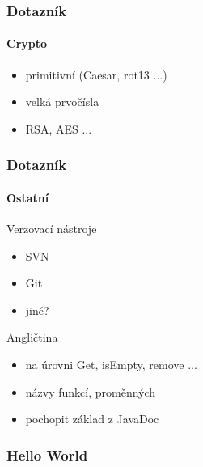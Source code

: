 \documentclass[nologo]{slides}
\begin{document}
\begin{frame}
    \frametitle{Dotazník}
    \framesubtitle{Crypto}

    \begin{itemize}
        \item primitivní (Caesar, rot13 ...)
        \item velká prvočísla
        \item RSA, AES ...

    \end{itemize}

\end{frame}

\begin{frame}
    \frametitle{Dotazník}
    \framesubtitle{Ostatní}

Verzovací nástroje
    \begin{itemize}
        \item SVN
        \item Git
        \item jiné?

    \end{itemize}

Angličtina
    \begin{itemize}
        \item na úrovni Get, isEmpty, remove ...
        \item názvy funkcí, proměnných
        \item pochopit základ z JavaDoc

    \end{itemize}

\end{frame}


\begin{frame}
    \frametitle{Hello World} 


\end{frame}
\end{document}
